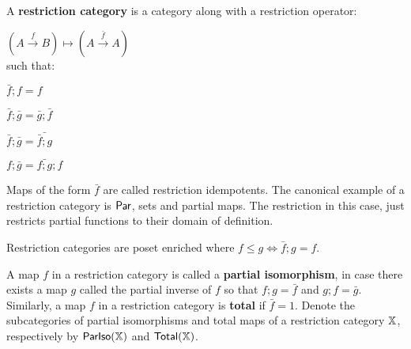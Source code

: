 \begin{definition}\cite[\S 2.1.1]{cockett}
A {\bf restriction category} is a category along with a restriction operator:

\hfil
$
(A \xrightarrow{f} B )\mapsto (A \xrightarrow{\bar f} A)
$\\
such that:

\begin{multicols}{2}
\begin{enumerate}[label={\bf [R.\arabic*]}, ref={\bf [R.\arabic*]}]
\item $\bar f ; f  = f$
\label{R.1}
\item $\bar f ; \bar g = \bar g ; \bar f$
\label{R.2}
\item $\bar f ; \bar g = \bar{\bar f ;  g}$
\label{R.3}
\item $f ; \bar g = \bar{f; g} ; f$
\label{R.4}
\end{enumerate}
\end{multicols}

Maps of the form $\bar f$ are called restriction idempotents.
The canonical example of a restriction category is $\mathsf{Par}$, sets and partial maps.  The restriction in this case, just restricts partial functions to their domain of definition.


Restriction categories are poset enriched where $f \leq g \iff \bar f ; g = f$.


A map $f$ in a restriction category is called a {\bf partial isomorphism}, in case there exists a map $g$ called the partial inverse of $f$ so that $f;g=\bar f$ and $g;f = \bar g$.  Similarly, a map $f$ in a restriction category is {\bf total} if $\bar f =1$.  Denote the subcategories of partial isomorphisms and total maps of a restriction category $\mathbb{X}$, respectively by $\mathsf{ParIso}(\mathbb{X})$ and $\mathsf{Total}(\mathbb{X})$.



\end{definition}

